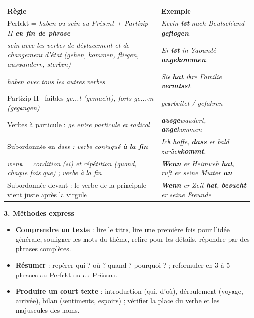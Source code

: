 \documentclass[11pt]{article}
\newcommand{\all}[1]{\ifmmode\text{\textit{#1}}\else\begingroup\selectlanguage{ngerman}\itshape #1\endgroup\fi}
\begin{document}
\begin{bilan}
\begin{tabularx}{\linewidth}{|X|X|}\hline
\rowcolor{popgreenL} \textbf{Règle} & \textbf{Exemple} \\ \hline
Perfekt = \all{haben} ou \all{sein} au Présent + Partizip II \textbf{en fin de phrase} & \all{Kevin \textbf{ist} nach Deutschland \textbf{geflogen}.} \\ \hline
\all{sein} avec les verbes de déplacement et de changement d'état (\all{gehen, kommen, fliegen, auswandern, sterben}) & \all{Er \textbf{ist} in Yaoundé \textbf{angekommen}.} \\ \hline
\all{haben} avec tous les autres verbes & \all{Sie \textbf{hat} ihre Familie \textbf{vermisst}.} \\ \hline
Partizip II : faibles \all{ge...t} (\all{gemacht}), forts \all{ge...en} (\all{gegangen}) & \all{gearbeitet / gefahren} \\ \hline
Verbes à particule : \all{ge} entre particule et radical & \all{\textbf{ausge}wandert, \textbf{ange}kommen} \\ \hline
Subordonnée en \all{dass} : verbe conjugué \textbf{à la fin} & \all{Ich hoffe, \textbf{dass} er bald zurück\textbf{kommt}.} \\ \hline
\all{wenn} = condition (si) et répétition (quand, chaque fois que) ; verbe à la fin & \all{\textbf{Wenn} er Heimweh \textbf{hat}, ruft er seine Mutter \textbf{an}.} \\ \hline
Subordonnée devant : le verbe de la principale vient juste après la virgule & \all{\textbf{Wenn} er Zeit \textbf{hat}, \textbf{besucht} er seine Freunde.} \\ \hline
\end{tabularx}

\textbf{3. Méthodes express}
\begin{itemize}
\item \textbf{Comprendre un texte} : lire le titre, lire une première fois pour l'idée générale, souligner les mots du thème, relire pour les détails, répondre par des phrases complètes.
\item \textbf{Résumer} : repérer qui ? où ? quand ? pourquoi ? ; reformuler en 3 à 5 phrases au Perfekt ou au Präsens.
\item \textbf{Produire un court texte} : introduction (qui, d'où), déroulement (voyage, arrivée), bilan (sentiments, espoirs) ; vérifier la place du verbe et les majuscules des noms.
\end{itemize}
\end{bilan}
\end{document}
